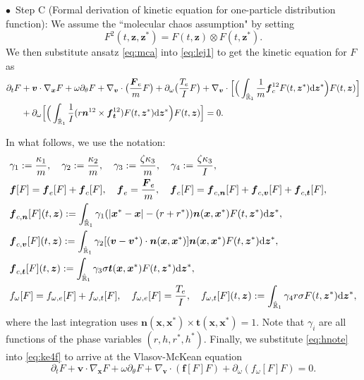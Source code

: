 \documentclass[a4paper,11pt]{article}
\numberwithin{equation}{section}
\theoremstyle{definition}
\newcommand{\bfx}{\boldsymbol{x}}
\newcommand{\bfz}{\boldsymbol{z}}
\newcommand{\bfv}{\boldsymbol{v}}
\newcommand{\bfn}{\boldsymbol{n}}
\newcommand{\bft}{\boldsymbol{t}}
\newcommand{\bff}{\boldsymbol{f}}
\newcommand{\bfF}{\boldsymbol{F}}
\newcommand{\bbr}{\mathbb R}
\def\d{{  \rm d}}
\begin{document}
\noindent $\bullet$~Step C (Formal derivation of kinetic equation for one-particle distribution function):  We assume the ``molecular chaos assumption" by setting
\begin{equation} \label{eq:mca}
F^2(t, \bfz, \bfz^*) = F(t, \bfz) \otimes F(t, \bfz^*). 
\end{equation}
%
We then substitute ansatz \eqref{eq:mca} into \eqref{eq:lej1} to get the kinetic equation for $F$ as
\begin{align}
\begin{aligned} \label{eq:ke4f}
  \partial_t F & +   \bfv  \cdot \nabla_{\bfx} F  + \omega \partial_\theta F + \nabla_{\bfv} \cdot \big( \frac{\bfF_e}{m} F \big)  
  +  \partial_{\omega} \big( \frac{T_e}{I} F \big)
  +  \nabla_{\bfv} \cdot \Big[ \Big( \int_{\hat{\bbr}_1} \frac{1}{m}   \bff_c^{12} F(t, \bfz^*)\d\bfz^*  \Big)  F(t, \bfz) \Big ] \\
  & +  \partial_{\omega} \Big[ \Big( \int_{\hat{\bbr}_1} \frac{1}{I}  ( r\bfn^{12}\times \bff_{\bft}^{12}) F(t, \bfz^*)\d\bfz^*  \Big)  F(t, \bfz) \Big ] 
 = 0.
\end{aligned}
\end{align}

%
In what follows, we use the notation:
\begin{align} 
&   \gamma_1 :=  \frac{\kappa_1}{m},  \quad \gamma_2 :=  \frac{\kappa_2}{m}, \quad \gamma_3 :=  \frac{\zeta\kappa_3}{m}, \quad \gamma_4 :=  \frac{\zeta\kappa_3}{I}, \nonumber \\
& \bff[F] = \bff_e[F] +  \bff_{c}[F],  \quad \bff_e =  \frac{\bfF_e}{m},  \quad \bff_{c}[F]  = \bff_{c,\bfn}[F] +  \bff_{c,\bfv}[F] +  \bff_{c,\bft}[F], \nonumber \\
& \bff_{c,\bfn}[F](t,\bfz) :=  \int_{\hat{\bbr}_1}  \gamma_1  (|\bfx^* - \bfx| - (r + r^*)) \bfn(\bfx, \bfx^*)  F(t, \bfz^*)\d\bfz^*, \nonumber \\
& \bff_{c,\bfv}[F](t,\bfz) :=  \int_{\hat{\bbr}_1}  \gamma_2 [ (\bfv  - \bfv^*) \cdot \bfn(\bfx, \bfx^*)] \bfn(\bfx, \bfx^*) F(t, \bfz^*)\d\bfz^*, \label{eq:hnote} \\
& \bff_{c,\bft}[F](t,\bfz) :=  \int_{\hat{\bbr}_1}  \gamma_3  \sigma  \bft(\bfx, \bfx^*) F(t, \bfz^*)\d\bfz^*, \nonumber \\
& f_{\omega}[F] = f_{\omega,e}[F] + f_{\omega,t}[F], \quad  f_{\omega,e}[F] = \frac{T_e}{I},
\quad f_{\omega,t}[F](t,\bfz) : = \int_{\hat{\bbr}_1}  \gamma_4 r \sigma F(t, \bfz^*)\d\bfz^*, \nonumber
\end{align}
where the last integration uses $\bfn(\bfx, \bfx^*) \times \bft(\bfx, \bfx^*) = 1.$
Note that $\gamma_i$ are all functions of the phase variables $(r,h,r^*,h^*)$. 
Finally, we substitute \eqref{eq:hnote} into \eqref{eq:ke4f} to arrive at the Vlasov-McKean equation
\begin{equation} \label{eq:vme}
 \partial_t F +   \bfv  \cdot \nabla_{\bfx} F + \omega \partial_\theta F +  \nabla_{\bfv} \cdot (\bff[F] F) +  \partial_{\omega} (f_{\omega}[F] F)= 0.
\end{equation}
\end{document}
